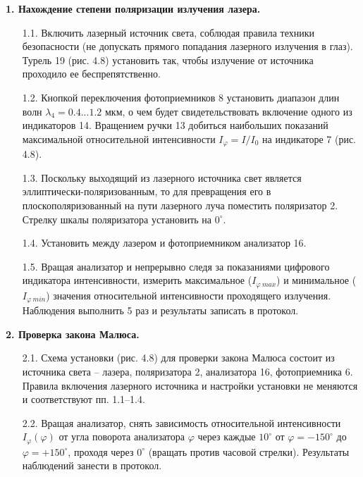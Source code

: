 \textbf{1. Нахождение степени поляризации излучения лазера.}
\begin{enumerate}
    \item[1.1.] Включить лазерный источник света, соблюдая правила техники безопасности (не допускать прямого попадания лазерного излучения в глаз). Турель 19 (рис. 4.8) установить так, чтобы излучение от источника проходило ее беспрепятственно.
    \item[1.2.] Кнопкой переключения фотоприемников 8 установить диапазон длин волн $\lambda_4 = 0.4...1.2$ мкм, о чем будет свидетельствовать включение одного из индикаторов 14. Вращением ручки 13 добиться наибольших показаний максимальной относительной интенсивности $I_{\varphi} = I/I_0$ на индикаторе 7 (рис. 4.8).
    \item[1.3.] Поскольку выходящий из лазерного источника свет является эллиптически-поляризованным, то для превращения его в плоскополяризованный на пути лазерного луча поместить поляризатор 2. Стрелку шкалы поляризатора установить на $0^\circ$.
    \item[1.4.] Установить между лазером и фотоприемником анализатор 16.
    \item[1.5.] Вращая анализатор и непрерывно следя за показаниями цифрового индикатора интенсивности, измерить максимальное ($I_{\varphi\ max}$) и минимальное ($I_{\varphi\ min}$) значения относительной интенсивности проходящего излучения. Наблюдения выполнить 5 раз и результаты записать в протокол.
\end{enumerate}

\textbf{2. Проверка закона Малюса.}
\begin{enumerate}
    \item[2.1.] Схема установки (рис. 4.8) для проверки закона Малюса состоит из источника света -- лазера, поляризатора 2, анализатора 16, фотоприемника 6. Правила включения лазерного источника и настройки установки не меняются и соответствуют пп. 1.1--1.4.
    \item[2.2.] Вращая анализатор, снять зависимость относительной интенсивности $I_\varphi(\varphi)$ от угла поворота анализатора $\varphi$ через каждые $10^\circ$ от $\varphi = -150^\circ$ до $\varphi = +150^\circ$, проходя через $0^\circ$ (вращать против часовой стрелки). Результаты наблюдений занести в протокол.
\end{enumerate}

